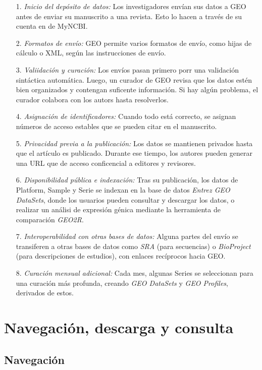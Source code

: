 \begin{itemize}
    \item[1.] \textit{Inicio del depósito de datos:} Los investigadores envían sus datos a GEO antes de enviar su manuscrito a una revista. Esto lo hacen a través de su cuenta en 
    de MyNCBI.
    \item[2.] \textit{Formatos de envío:} GEO permite varios formatos de envío, como hijas de cálculo o XML, según las instrucciones de envío.
    \item[3.] \textit{Valiidación y curación:} Los envíos pasan primero porr una validación sintáctica automática. Luego, un curador de GEO revisa que los datos estén bien organizados
    y contengan suficente información. Si hay algún problema, el curador colabora con los autors hasta resolverlos.
    \item[4.] \textit{Asignación de identificadores:} Cuando todo está correcto, se asignan números de acceso estables que se pueden citar en el manuscrito.
    \item[5.] \textit{Privacidad previa a la publicación:} Los datos se mantienen privados hasta que el artículo es publicado. Durante ese tiempo, los autores pueden generar una URL
    que de acceso conficencial a editores y revisores.
    \item[6.] \textit{Disponibilidad pública e indexación:} Tras su publicación, los datos de Platform, Sample y Serie se indexan en la base de datos \textit{Entrez GEO DataSets}, donde
    los usuarios pueden consultar y descargar los datos, o realizar un análisi de expresión génica mediante la herramienta de comparación \textit{GEO2R}.
    \item[7.] \textit{Interoperabilidad con otras bases de datos:} Alguna partes del envío se transiferen a otras bases de datos como \textit{SRA} (para secuencias) o \textit{BioProject}
    (para descripciones de estudios), con enlaces recíprocos hacia GEO.
    \item[8.] \textit{Curación mensual adicional:} Cada mes, algunas Series se seleccionan para una curación más profunda, creando \textit{GEO DataSets} y \textit{GEO Profiles}, derivados 
    de estos.
    
\end{itemize}

\section{Navegación, descarga y consulta}


\subsection{Navegación}


